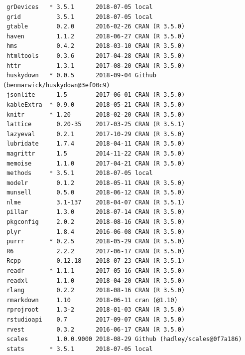 \documentclass[twoside,12pt,final]{ucthesis-CA2012} %
\begin{document}
\begin{ucmainmatter}
\begin{verbatim}
 grDevices   * 3.5.1      2018-07-05 local                                
 grid          3.5.1      2018-07-05 local                                
 gtable        0.2.0      2016-02-26 CRAN (R 3.5.0)                       
 haven         1.1.2      2018-06-27 CRAN (R 3.5.0)                       
 hms           0.4.2      2018-03-10 CRAN (R 3.5.0)                       
 htmltools     0.3.6      2017-04-28 CRAN (R 3.5.0)                       
 httr          1.3.1      2017-08-20 CRAN (R 3.5.0)                       
 huskydown   * 0.0.5      2018-09-04 Github (benmarwick/huskydown@3ef00c9)
 jsonlite      1.5        2017-06-01 CRAN (R 3.5.0)                       
 kableExtra  * 0.9.0      2018-05-21 CRAN (R 3.5.0)                       
 knitr       * 1.20       2018-02-20 CRAN (R 3.5.0)                       
 lattice       0.20-35    2017-03-25 CRAN (R 3.5.1)                       
 lazyeval      0.2.1      2017-10-29 CRAN (R 3.5.0)                       
 lubridate     1.7.4      2018-04-11 CRAN (R 3.5.0)                       
 magrittr      1.5        2014-11-22 CRAN (R 3.5.0)                       
 memoise       1.1.0      2017-04-21 CRAN (R 3.5.0)                       
 methods     * 3.5.1      2018-07-05 local                                
 modelr        0.1.2      2018-05-11 CRAN (R 3.5.0)                       
 munsell       0.5.0      2018-06-12 CRAN (R 3.5.0)                       
 nlme          3.1-137    2018-04-07 CRAN (R 3.5.1)                       
 pillar        1.3.0      2018-07-14 CRAN (R 3.5.0)                       
 pkgconfig     2.0.2      2018-08-16 CRAN (R 3.5.0)                       
 plyr          1.8.4      2016-06-08 CRAN (R 3.5.0)                       
 purrr       * 0.2.5      2018-05-29 CRAN (R 3.5.0)                       
 R6            2.2.2      2017-06-17 CRAN (R 3.5.0)                       
 Rcpp          0.12.18    2018-07-23 CRAN (R 3.5.1)                       
 readr       * 1.1.1      2017-05-16 CRAN (R 3.5.0)                       
 readxl        1.1.0      2018-04-20 CRAN (R 3.5.0)                       
 rlang         0.2.2      2018-08-16 CRAN (R 3.5.0)                       
 rmarkdown     1.10       2018-06-11 cran (@1.10)                         
 rprojroot     1.3-2      2018-01-03 CRAN (R 3.5.0)                       
 rstudioapi    0.7        2017-09-07 CRAN (R 3.5.0)                       
 rvest         0.3.2      2016-06-17 CRAN (R 3.5.0)                       
 scales        1.0.0.9000 2018-08-29 Github (hadley/scales@0f7a186)       
 stats       * 3.5.1      2018-07-05 local                                

\end{verbatim}
\end{ucmainmatter}
\end{document}
